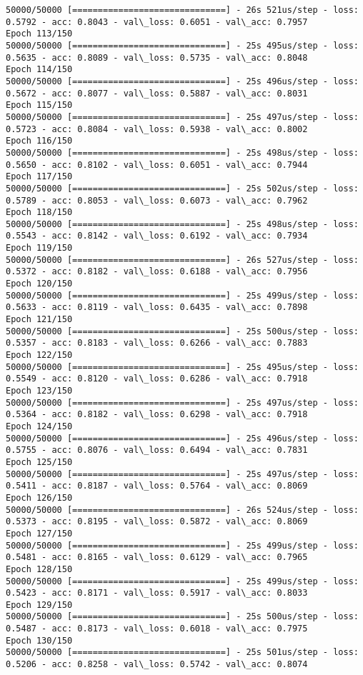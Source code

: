 \documentclass[11pt]{article}
\begin{document}
\begin{Verbatim}[commandchars=\\\{\}]
50000/50000 [==============================] - 26s 521us/step - loss: 0.5792 - acc: 0.8043 - val\_loss: 0.6051 - val\_acc: 0.7957
Epoch 113/150
50000/50000 [==============================] - 25s 495us/step - loss: 0.5635 - acc: 0.8089 - val\_loss: 0.5735 - val\_acc: 0.8048
Epoch 114/150
50000/50000 [==============================] - 25s 496us/step - loss: 0.5672 - acc: 0.8077 - val\_loss: 0.5887 - val\_acc: 0.8031
Epoch 115/150
50000/50000 [==============================] - 25s 497us/step - loss: 0.5723 - acc: 0.8084 - val\_loss: 0.5938 - val\_acc: 0.8002
Epoch 116/150
50000/50000 [==============================] - 25s 498us/step - loss: 0.5650 - acc: 0.8102 - val\_loss: 0.6051 - val\_acc: 0.7944
Epoch 117/150
50000/50000 [==============================] - 25s 502us/step - loss: 0.5789 - acc: 0.8053 - val\_loss: 0.6073 - val\_acc: 0.7962
Epoch 118/150
50000/50000 [==============================] - 25s 498us/step - loss: 0.5543 - acc: 0.8142 - val\_loss: 0.6192 - val\_acc: 0.7934
Epoch 119/150
50000/50000 [==============================] - 26s 527us/step - loss: 0.5372 - acc: 0.8182 - val\_loss: 0.6188 - val\_acc: 0.7956
Epoch 120/150
50000/50000 [==============================] - 25s 499us/step - loss: 0.5633 - acc: 0.8119 - val\_loss: 0.6435 - val\_acc: 0.7898
Epoch 121/150
50000/50000 [==============================] - 25s 500us/step - loss: 0.5357 - acc: 0.8183 - val\_loss: 0.6266 - val\_acc: 0.7883
Epoch 122/150
50000/50000 [==============================] - 25s 495us/step - loss: 0.5549 - acc: 0.8120 - val\_loss: 0.6286 - val\_acc: 0.7918
Epoch 123/150
50000/50000 [==============================] - 25s 497us/step - loss: 0.5364 - acc: 0.8182 - val\_loss: 0.6298 - val\_acc: 0.7918
Epoch 124/150
50000/50000 [==============================] - 25s 496us/step - loss: 0.5755 - acc: 0.8076 - val\_loss: 0.6494 - val\_acc: 0.7831
Epoch 125/150
50000/50000 [==============================] - 25s 497us/step - loss: 0.5411 - acc: 0.8187 - val\_loss: 0.5764 - val\_acc: 0.8069
Epoch 126/150
50000/50000 [==============================] - 26s 524us/step - loss: 0.5373 - acc: 0.8195 - val\_loss: 0.5872 - val\_acc: 0.8069
Epoch 127/150
50000/50000 [==============================] - 25s 499us/step - loss: 0.5481 - acc: 0.8165 - val\_loss: 0.6129 - val\_acc: 0.7965
Epoch 128/150
50000/50000 [==============================] - 25s 499us/step - loss: 0.5423 - acc: 0.8171 - val\_loss: 0.5917 - val\_acc: 0.8033
Epoch 129/150
50000/50000 [==============================] - 25s 500us/step - loss: 0.5487 - acc: 0.8173 - val\_loss: 0.6018 - val\_acc: 0.7975
Epoch 130/150
50000/50000 [==============================] - 25s 501us/step - loss: 0.5206 - acc: 0.8258 - val\_loss: 0.5742 - val\_acc: 0.8074

\end{Verbatim}
\end{document}
